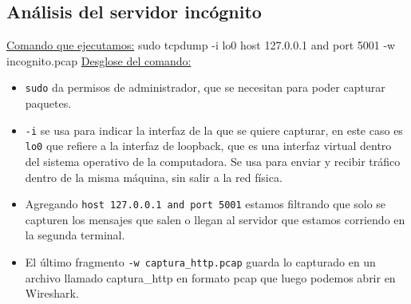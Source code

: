 \documentclass[12pt]{article} %
\begin{document}

\subsection{Análisis del servidor incógnito} %

\underline {Comando que ejecutamos:}
sudo tcpdump -i lo0 host 127.0.0.1 and port 5001 -w incognito.pcap
\newline
\newline
\underline {Desglose del comando:}
\begin{itemize}
    \item\texttt{sudo} da permisos de administrador, que se necesitan para poder capturar paquetes.
    \item  \texttt{-i} se usa para indicar la interfaz de la que se quiere capturar, en este caso es \texttt{lo0} que refiere a la interfaz de loopback, que es una interfaz virtual dentro del sistema operativo de la computadora. Se usa para enviar y recibir tráfico dentro de la misma máquina, sin salir a la red física.
    \item Agregando \texttt{host 127.0.0.1 and port 5001} estamos filtrando que solo se capturen los mensajes que salen o llegan al servidor que estamos corriendo en la segunda terminal.
    \item El último fragmento \texttt{-w captura\_http.pcap} guarda lo capturado en un 
    archivo llamado captura\_http en formato pcap que luego podemos abrir en Wireshark.
\end{itemize}
 
\end{document}

